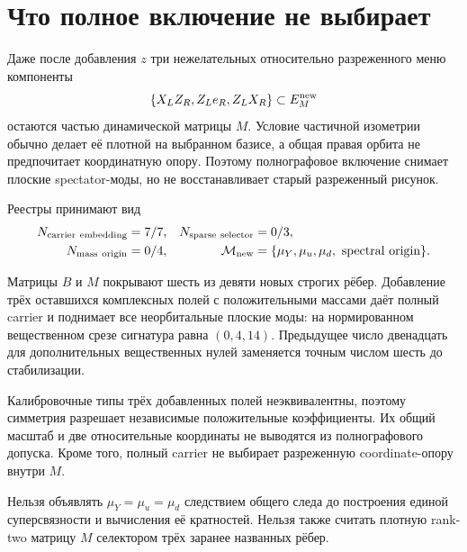 \section{Что полное включение не выбирает}

Даже после добавления $z$ три нежелательных относительно разреженного меню
компоненты
\begin{equation}
 \{X_LZ_R,Z_Le_R,Z_LX_R\}\subset E_M^{\rm new}
 \label{eq:v8-full-graph-aligned-present-unwanted}
\end{equation}
остаются частью динамической матрицы $M$. Условие частичной изометрии
обычно делает её плотной на выбранном базисе, а общая правая орбита не
предпочитает координатную опору. Поэтому полнографовое включение снимает
плоские spectator-моды, но не восстанавливает старый разреженный рисунок.

Реестры принимают вид
\begin{equation}
 \begin{aligned}
 N_{\rm carrier\ embedding}&=7/7,
 &N_{\rm sparse\ selector}&=0/3,\\
 N_{\rm mass\ origin}&=0/4,
 &\mathcal M_{\rm new}&=\{\mu_Y,\mu_u,\mu_d,\text{ spectral origin}\}.
 \end{aligned}
 \label{eq:v8-full-graph-aligned-ledgers}
\end{equation}

\begin{theorem}
Матрицы $B$ и $M$ покрывают шесть из девяти новых строгих рёбер. Добавление
трёх оставшихся комплексных полей с положительными массами даёт полный
carrier и поднимает все неорбитальные плоские моды: на нормированном
вещественном срезе сигнатура равна $(0,4,14)$. Предыдущее число двенадцать
для дополнительных вещественных нулей заменяется точным числом шесть до
стабилизации.
\end{theorem}

\begin{proposition}
Калибровочные типы трёх добавленных полей неэквивалентны, поэтому симметрия
разрешает независимые положительные коэффициенты. Их общий масштаб и две
относительные координаты не выводятся из полнографового допуска. Кроме того,
полный carrier не выбирает разреженную coordinate-опору внутри $M$.
\end{proposition}

\begin{nogocriterion}
Нельзя объявлять $\mu_Y=\mu_u=\mu_d$ следствием общего следа до построения
единой суперсвязности и вычисления её кратностей. Нельзя также считать
плотную rank-two матрицу $M$ селектором трёх заранее названных рёбер.
\end{nogocriterion}

